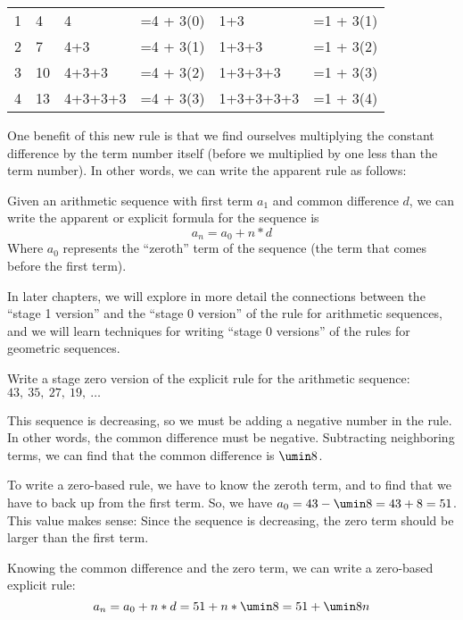 \begin{center}\begin{tabular}{C{1cm}C{1cm}|L{3cm}L{2cm}|L{3cm}L{2cm}}
& &  &&  &
\\ & 4
& 4 & =4 + 3(0)
& 1+3 & =1 + 3(1)
\\
2 & 7
& 4+3 & =4 + 3(1)
& 1+3+3 & =1 + 3(2)
\\
3 & 10
& 4+3+3 & =4 + 3(2)
& 1+3+3+3 & =1 + 3(3)
\\
4 & 13
& 4+3+3+3 & =4 + 3(3)
& 1+3+3+3+3 & =1 + 3(4)
\\
\end{tabular}\end{center}

One benefit of this new rule is that we find ourselves multiplying the constant difference by the term number itself (before we multiplied by one less than the term number). In other words, we can write the apparent rule as follows:

\begin{boxeddef}
Given an arithmetic sequence with first term $a_1$ and common difference $d$, we can write the apparent or explicit formula for the sequence is \[a_n = a_0 + n \ast d\] Where $a_0$ represents the ``zeroth'' term of the sequence (the term that comes before the first term).
\end{boxeddef}

In later chapters, we will explore in more detail the connections between the ``stage 1 version'' and the ``stage 0 version'' of the rule for arithmetic sequences, and we will learn techniques for writing ``stage 0 versions'' of the rules for geometric sequences.

\begin{boxedex}
Write a stage zero version of the explicit rule for the arithmetic sequence: $43,~ 35,~ 27,~ 19,~ \dotsc$

\exsoln{} This sequence is decreasing, so we must be adding a negative number in the rule. In other words, the common difference must be negative. Subtracting neighboring terms, we can find that the common difference is $\umin8$.

To write a zero-based rule, we have to know the zeroth term, and to find that we have to back up from the first term. So, we have $a_0 = 43 - \umin8 = 43 + 8 = 51$. This value makes sense: Since the sequence is decreasing, the zero term should be larger than the first term.

Knowing the common difference and the zero term, we can write a zero-based explicit rule: \[a_n = a_0 + n \ast d = 51 + n \ast \umin8 = 51 + \umin8n\]
\end{boxedex}

